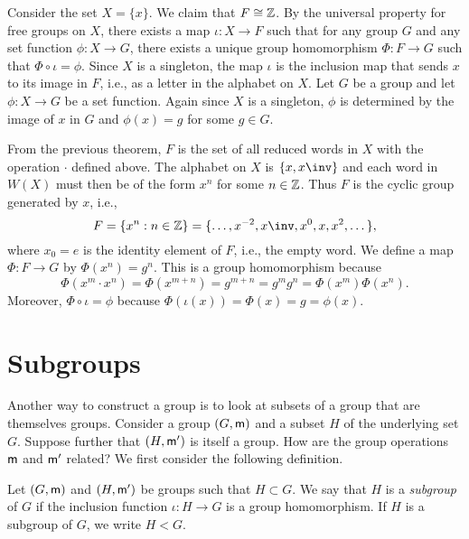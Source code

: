 \begin{example}
    Consider the set \(X = \{x\}\). We claim that \(F \cong \mathbb{Z}\). By the
    universal property for free groups on \(X\), there exists a map \(\iota : X
    \to F\) such that for any group \(G\) and any set function \(\phi : X \to
    G\), there exists a unique group homomorphism \(\Phi : F \to G\) such that
    \(\Phi \circ \iota = \phi\). Since \(X\) is a singleton, the map \(\iota\)
    is the inclusion map that sends \(x\) to its image in \(F\), i.e., as a
    letter in the alphabet on \(X\). Let \(G\) be a group and let \(\phi : X \to
    G\) be a set function. Again since \(X\) is a singleton, \(\phi\) is
    determined by the image of \(x\) in \(G\) and \(\phi(x) = g\) for some \(g
    \in G\).

    From the previous theorem, \(F\) is the set of all reduced words in \(X\)
    with the operation \(\cdot\) defined above. The alphabet on \(X\) is \(\{x,
    x\inv\}\) and each word in \(W(X)\) must then be of the form  \(x^n\) for
    some \(n \in \mathbb{Z}\). Thus \(F\) is the cyclic group generated by \(x\), i.e.,
    \[
        F = \{x^n : n \in \Z\} = \{\dots, x^{-2}, x\inv, x^0, x, x^2, \dots\},
    \]
    where \(x_0 = e\) is the identity element of \(F\), i.e., the empty word. We
    define a map \(\Phi : F \to G\) by \(\Phi(x^n) = g^n\). This is a group
    homomorphism because
    \[
        \Phi(x^m \cdot x^n) = \Phi(x^{m + n}) = g^{m + n} = g^m g^n = \Phi(x^m) \Phi(x^n).
    \]
    Moreover, \(\Phi \circ \iota = \phi\) because \(\Phi(\iota(x)) = \Phi(x) = g
    = \phi(x)\).
\end{example}

\section{Subgroups}

Another way to construct a group is to look at subsets of a group that are
themselves groups. Consider a group \((G, {\mathsf{m}})\) and a subset \(H\) of the
underlying set \(G\). Suppose further that \((H, {\mathsf{m}}')\) is itself a group.
How are the group operations \({\mathsf{m}}\) and \({\mathsf{m}}'\) related? We first consider
the following definition.

\begin{definition}
    Let \((G, {\mathsf{m}})\) and \((H, {\mathsf{m}}')\) be groups such that \(H \subset G\).
    We say that \(H\) is a \emph{subgroup} of \(G\) if the inclusion function
    \(\iota : H \to G\) is a group homomorphism. If \(H\) is a subgroup of
    \(G\), we write \(H < G\).
\end{definition}


